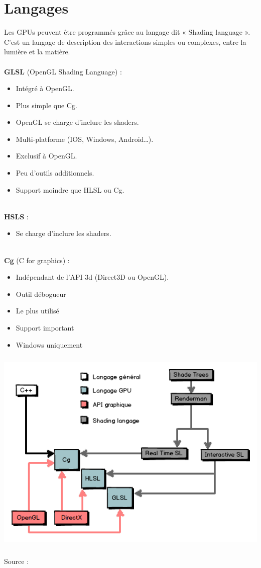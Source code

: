 \section{Langages}
Les GPUs peuvent être programmés grâce au langage dit « Shading language ». C’est un langage de description des interactions simples ou complexes, entre la lumière et la matière.\\
\textbf{\\GLSL} (OpenGL Shading Language) : 
\begin{itemize}
	\item Intégré à OpenGL.
	\item Plus simple que Cg.
	\item OpenGL se charge d’inclure les shaders.
	\item Multi-platforme (IOS, Windows, Android…).
	\item Exclusif à OpenGL.
	\item Peu d’outils additionnels.
	\item Support moindre que HLSL ou Cg.
\end{itemize}
\textbf{\\HSLS} :
\begin{itemize}
	\item Se charge d’inclure les shaders.
\end{itemize}
\textbf{\\Cg} (C for graphics) : 
\begin{itemize}
	\item Indépendant de l’API 3d (Direct3D ou OpenGL).
	\item Outil débogueur
	\item Le plus utilisé
	\item Support important
	\item Windows uniquement
\end{itemize}
\begin{center}
\includegraphics[width=14cm,height=100mm]{pipeline/images/langages.png}
\end{center}

Source : \cite{shader2}